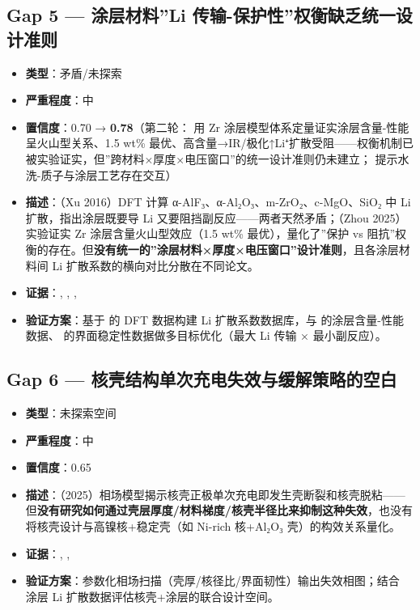 \documentclass[12pt,a4paper]{ctexart}
\providecommand{\tightlist}{%
  \setlength{\itemsep}{0pt}\setlength{\parskip}{0pt}}
\begin{document}
\subsection{Gap 5 --- 涂层材料''Li 传输-保护性''权衡缺乏统一设计准则}\label{gap:gap-5-ux6d82ux5c42ux6750ux6599li-ux4f20ux8f93-ux4fddux62a4ux6027ux6743ux8861ux7f3aux4e4fux7edfux4e00ux8bbeux8ba1ux51c6ux5219}

\begin{itemize}
\tightlist
\item
  \textbf{类型}：矛盾/未探索
\item
  \textbf{严重程度}：中
\item
  \textbf{置信度}：0.70 → \textbf{0.78}（第二轮：\cite{p46} 用 Zr 涂层模型体系定量证实涂层含量-性能呈火山型关系、1.5 wt\% 最优、高含量→IR/极化↑Li⁺扩散受阻------权衡机制已被实验证实，但''跨材料×厚度×电压窗口''的统一设计准则仍未建立；\cite{p48} 提示水洗-质子与涂层工艺存在交互）
\item
  \textbf{描述}：\cite{p42}（Xu 2016）DFT 计算 α-AlF₃、α-Al₂O₃、m-ZrO₂、c-MgO、SiO₂ 中 Li 扩散，指出涂层既要导 Li 又要阻挡副反应------两者天然矛盾；\cite{p46}（Zhou 2025）实验证实 Zr 涂层含量火山型效应（1.5 wt\% 最优），量化了''保护 vs 阻抗''权衡的存在。但\textbf{没有统一的''涂层材料×厚度×电压窗口''设计准则}，且各涂层材料间 Li 扩散系数的横向对比分散在不同论文。
\item
  \textbf{证据}：\cite{p42}, \cite{p39}, \cite{p46}, \cite{p48}
\item
  \textbf{验证方案}：基于 \cite{p42} 的 DFT 数据构建 Li 扩散系数数据库，与 \cite{p46} 的涂层含量-性能数据、\cite{p39} 的界面稳定性数据做多目标优化（最大 Li 传输 × 最小副反应）。
\end{itemize}

\subsection{Gap 6 --- 核壳结构单次充电失效与缓解策略的空白}\label{gap:gap-6-ux6838ux58f3ux7ed3ux6784ux5355ux6b21ux5145ux7535ux5931ux6548ux4e0eux7f13ux89e3ux7b56ux7565ux7684ux7a7aux767d}

\begin{itemize}
\tightlist
\item
  \textbf{类型}：未探索空间
\item
  \textbf{严重程度}：中
\item
  \textbf{置信度}：0.65
\item
  \textbf{描述}：\cite{p33}（2025）相场模型揭示核壳正极单次充电即发生壳断裂和核壳脱粘------但\textbf{没有研究如何通过壳层厚度/材料梯度/核壳半径比来抑制这种失效}，也没有将核壳设计与高镍核+稳定壳（如 Ni-rich 核+Al₂O₃ 壳）的构效关系量化。
\item
  \textbf{证据}：\cite{p33}, \cite{p39}, \cite{p42}
\item
  \textbf{验证方案}：参数化相场扫描（壳厚/核径比/界面韧性）输出失效相图；结合 \cite{p42} 涂层 Li 扩散数据评估核壳+涂层的联合设计空间。
\end{itemize}
\end{document}
